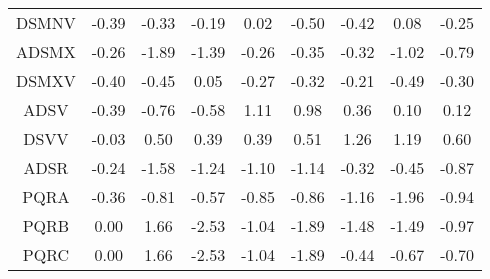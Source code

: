 \begin{longtable}{ | c || c | c | c | c | c | c | c || c |}
DSMNV &  \cellcolor[HTML]{FFF7F7} -0.39 &  \cellcolor[HTML]{FFF7F7} -0.33 &  \cellcolor[HTML]{FFF7F7} -0.19 &  \cellcolor[HTML]{FFFFFF} 0.02 &  \cellcolor[HTML]{FFEFEF} -0.50 &  \cellcolor[HTML]{FFF7F7} -0.42 &  \cellcolor[HTML]{FFFFFF} 0.08 &  \cellcolor[HTML]{FFF7F7} -0.25 \\
ADSMX &  \cellcolor[HTML]{FFF7F7} -0.26 &  \cellcolor[HTML]{FFCFCF} -1.89 &  \cellcolor[HTML]{FFDFDF} -1.39 &  \cellcolor[HTML]{FFF7F7} -0.26 &  \cellcolor[HTML]{FFF7F7} -0.35 &  \cellcolor[HTML]{FFF7F7} -0.32 &  \cellcolor[HTML]{FFE7E7} -1.02 &  \cellcolor[HTML]{FFEFEF} -0.79 \\
DSMXV &  \cellcolor[HTML]{FFF7F7} -0.40 &  \cellcolor[HTML]{FFF7F7} -0.45 &  \cellcolor[HTML]{FFFFFF} 0.05 &  \cellcolor[HTML]{FFF7F7} -0.27 &  \cellcolor[HTML]{FFF7F7} -0.32 &  \cellcolor[HTML]{FFF7F7} -0.21 &  \cellcolor[HTML]{FFEFEF} -0.49 &  \cellcolor[HTML]{FFF7F7} -0.30 \\
ADSV &  \cellcolor[HTML]{FFF7F7} -0.39 &  \cellcolor[HTML]{FFEFEF} -0.76 &  \cellcolor[HTML]{FFEFEF} -0.58 &  \cellcolor[HTML]{E7E7FF} 1.11 &  \cellcolor[HTML]{E7E7FF} 0.98 &  \cellcolor[HTML]{F7F7FF} 0.36 &  \cellcolor[HTML]{FFFFFF} 0.10 &  \cellcolor[HTML]{FFFFFF} 0.12 \\
DSVV &  \cellcolor[HTML]{FFFFFF} -0.03 &  \cellcolor[HTML]{EFEFFF} 0.50 &  \cellcolor[HTML]{F7F7FF} 0.39 &  \cellcolor[HTML]{F7F7FF} 0.39 &  \cellcolor[HTML]{EFEFFF} 0.51 &  \cellcolor[HTML]{DFDFFF} 1.26 &  \cellcolor[HTML]{DFDFFF} 1.19 &  \cellcolor[HTML]{EFEFFF} 0.60 \\
ADSR &  \cellcolor[HTML]{FFF7F7} -0.24 &  \cellcolor[HTML]{FFD7D7} -1.58 &  \cellcolor[HTML]{FFDFDF} -1.24 &  \cellcolor[HTML]{FFE7E7} -1.10 &  \cellcolor[HTML]{FFDFDF} -1.14 &  \cellcolor[HTML]{FFF7F7} -0.32 &  \cellcolor[HTML]{FFF7F7} -0.45 &  \cellcolor[HTML]{FFE7E7} -0.87 \\
PQRA &  \cellcolor[HTML]{FFF7F7} -0.36 &  \cellcolor[HTML]{FFE7E7} -0.81 &  \cellcolor[HTML]{FFEFEF} -0.57 &  \cellcolor[HTML]{FFE7E7} -0.85 &  \cellcolor[HTML]{FFE7E7} -0.86 &  \cellcolor[HTML]{FFDFDF} -1.16 &  \cellcolor[HTML]{FFCFCF} -1.96 &  \cellcolor[HTML]{FFE7E7} -0.94 \\
PQRB &  \cellcolor[HTML]{FFFFFF} 0.00 &  \cellcolor[HTML]{D7D7FF} 1.66 &  \cellcolor[HTML]{FFBFBF} -2.53 &  \cellcolor[HTML]{FFE7E7} -1.04 &  \cellcolor[HTML]{FFCFCF} -1.89 &  \cellcolor[HTML]{FFD7D7} -1.48 &  \cellcolor[HTML]{FFD7D7} -1.49 &  \cellcolor[HTML]{FFE7E7} -0.97 \\
PQRC &  \cellcolor[HTML]{FFFFFF} 0.00 &  \cellcolor[HTML]{D7D7FF} 1.66 &  \cellcolor[HTML]{FFBFBF} -2.53 &  \cellcolor[HTML]{FFE7E7} -1.04 &  \cellcolor[HTML]{FFCFCF} -1.89 &  \cellcolor[HTML]{FFF7F7} -0.44 &  \cellcolor[HTML]{FFEFEF} -0.67 &  \cellcolor[HTML]{FFEFEF} -0.70 \\

\end{longtable}
